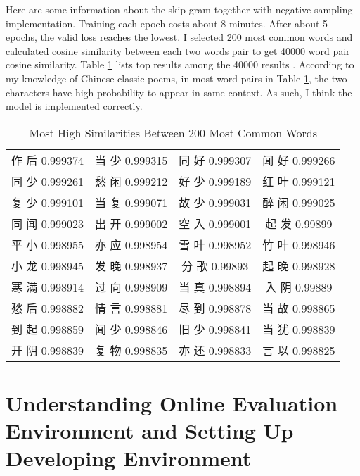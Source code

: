 \documentclass[12pt]{article}
\begin{document}
Here are some information about the skip-gram together with negative sampling implementation. Training each epoch costs about 8 minutes. After about 5 epochs, the valid loss reaches the lowest. I selected 200 most common words and calculated cosine similarity between each two words pair to get 40000 word pair cosine similarity. Table \ref{table:similarity} lists top results among the 40000 results . According to my knowledge of Chinese classic poems, in most word pairs in Table \ref{table:similarity}, the two characters have high probability to appear in same context. As such, I think the model is implemented correctly.
\begin{CJK*}{UTF8}{gbsn}
\begin{table}[h!]
\centering
\begin{tabular}{c c c c }
作 后 0.999374 &
当 少 0.999315 &
同 好 0.999307 &
闻 好 0.999266 \\
同 少 0.999261 &
愁 闲 0.999212 &
好 少 0.999189 &
红 叶 0.999121 \\
复 少 0.999101 &
当 复 0.999071 &
故 少 0.999031 &
醉 闲 0.999025 \\
同 闻 0.999023 &
出 开 0.999002 &
空 入 0.999001 &
起 发 0.99899 \\
平 小 0.998955 &
亦 应 0.998954 &
雪 叶 0.998952 &
竹 叶 0.998946 \\
小 龙 0.998945 &
发 晚 0.998937 &
分 歌 0.99893 &
起 晚 0.998928 \\
寒 满 0.998914 &
过 向 0.998909 &
当 真 0.998894 &
入 阴 0.99889 \\
愁 后 0.998882 &
情 言 0.998881 &
尽 到 0.998878 &
当 故 0.998865 \\
到 起 0.998859 &
闻 少 0.998846 &
旧 少 0.998841 &
当 犹 0.998839 \\
开 阴 0.998839 &
复 物 0.998835 &
亦 还 0.998833 &
言 以 0.998825 \\

\end{tabular}
\caption{Most High Similarities Between 200 Most Common Words}
\label{table:similarity}
\end{table}
\end{CJK*}



\break

\section{Understanding Online Evaluation Environment and Setting Up Developing Environment}\label{sec:setup}
\end{document}
